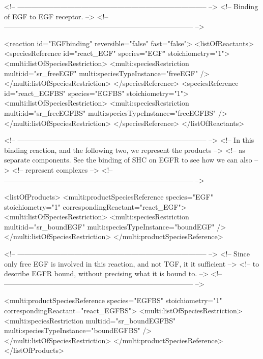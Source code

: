 \begin{example}
<!-- -------------------------------------------------------------------------------- -->
<!-- Binding of EGF to EGF receptor.                                                  -->
<!-- -------------------------------------------------------------------------------- -->

       <reaction id="EGFbinding" reversible="false" fast="false"> 
        <listOfReactants>
          <speciesReference id="react_EGF" species="EGF" stoichiometry="1">
            <multi:listOfSpeciesRestriction>
              <multi:speciesRestriction multi:id="sr_freeEGF" 
                                        multi:speciesTypeInstance="freeEGF" />
            </multi:listOfSpeciesRestriction>
          </speciesReference>
          <speciesReference id="react_EGFBS" species="EGFBS" stoichiometry="1">
            <multi:listOfSpeciesRestriction>
              <multi:speciesRestriction multi:id="sr_freeEGFBS" 
                                        multi:speciesTypeInstance="freeEGFBS" />
            </multi:listOfSpeciesRestriction>
          </speciesReference>
        </listOfReactants>

<!-- -------------------------------------------------------------------------------- -->
<!-- In this binding reaction, and the following two, we represent the products       --> 
<!-- as separate components. See the binding of SHC on EGFR to see how we can also    --> 
<!-- represent complexes                                                              -->
<!-- -------------------------------------------------------------------------------- -->
 
        <listOfProducts>
          <multi:productSpeciesReference species="EGF" stoichiometry="1"
                                   correspondingReactant="react_EGF">
            <multi:listOfSpeciesRestriction>
              <multi:speciesRestriction multi:id="sr_boundEGF" 
                                        multi:speciesTypeInstance="boundEGF" />
            </multi:listOfSpeciesRestriction>
          </multi:productSpeciesReference>

<!-- -------------------------------------------------------------------------------- -->
<!-- Since only free EGF is involved in this reaction, and not TGF, it it sufficient  --> 
<!-- to describe EGFR bound, without precising what it is bound to.                   -->
<!-- -------------------------------------------------------------------------------- -->

          <multi:productSpeciesReference species="EGFBS" stoichiometry="1"
                                   correspondingReactant="react_EGFBS">
            <multi:listOfSpeciesRestriction>
              <multi:speciesRestriction multi:id="sr_boundEGFBS" 
                                        multi:speciesTypeInstance="boundEGFBS" />
            </multi:listOfSpeciesRestriction>
          </multi:productSpeciesReference>
        </listOfProducts>


\end{example}
